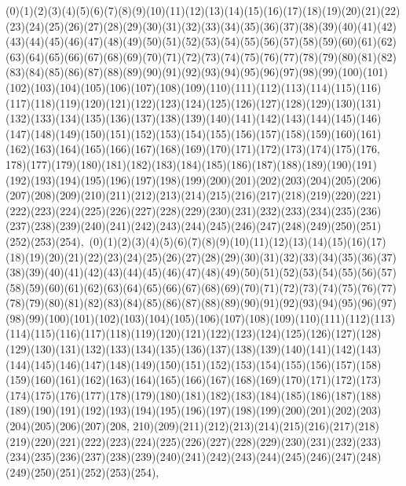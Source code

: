 \documentclass[12pt]{article}
\begin{document}
{(0)(1)(2)(3)(4)(5)(6)(7)(8)(9)(10)(11)(12)(13)(14)(15)(16)(17)(18)(19)(20)(21)(22)(23)(24)(25)(26)(27)(28)(29)(30)(31)(32)(33)(34)(35)(36)(37)(38)(39)(40)(41)(42)(43)(44)(45)(46)(47)(48)(49)(50)(51)(52)(53)(54)(55)(56)(57)(58)(59)(60)(61)(62)(63)(64)(65)(66)(67)(68)(69)(70)(71)(72)(73)(74)(75)(76)(77)(78)(79)(80)(81)(82)(83)(84)(85)(86)(87)(88)(89)(90)(91)(92)(93)(94)(95)(96)(97)(98)(99)(100)(101)(102)(103)(104)(105)(106)(107)(108)(109)(110)(111)(112)(113)(114)(115)(116)(117)(118)(119)(120)(121)(122)(123)(124)(125)(126)(127)(128)(129)(130)(131)(132)(133)(134)(135)(136)(137)(138)(139)(140)(141)(142)(143)(144)(145)(146)(147)(148)(149)(150)(151)(152)(153)(154)(155)(156)(157)(158)(159)(160)(161)(162)(163)(164)(165)(166)(167)(168)(169)(170)(171)(172)(173)(174)(175)(176, 178)(177)(179)(180)(181)(182)(183)(184)(185)(186)(187)(188)(189)(190)(191)(192)(193)(194)(195)(196)(197)(198)(199)(200)(201)(202)(203)(204)(205)(206)(207)(208)(209)(210)(211)(212)(213)(214)(215)(216)(217)(218)(219)(220)(221)(222)(223)(224)(225)(226)(227)(228)(229)(230)(231)(232)(233)(234)(235)(236)(237)(238)(239)(240)(241)(242)(243)(244)(245)(246)(247)(248)(249)(250)(251)(252)(253)(254)$
, 
$
(0)(1)(2)(3)(4)(5)(6)(7)(8)(9)(10)(11)(12)(13)(14)(15)(16)(17)(18)(19)(20)(21)(22)(23)(24)(25)(26)(27)(28)(29)(30)(31)(32)(33)(34)(35)(36)(37)(38)(39)(40)(41)(42)(43)(44)(45)(46)(47)(48)(49)(50)(51)(52)(53)(54)(55)(56)(57)(58)(59)(60)(61)(62)(63)(64)(65)(66)(67)(68)(69)(70)(71)(72)(73)(74)(75)(76)(77)(78)(79)(80)(81)(82)(83)(84)(85)(86)(87)(88)(89)(90)(91)(92)(93)(94)(95)(96)(97)(98)(99)(100)(101)(102)(103)(104)(105)(106)(107)(108)(109)(110)(111)(112)(113)(114)(115)(116)(117)(118)(119)(120)(121)(122)(123)(124)(125)(126)(127)(128)(129)(130)(131)(132)(133)(134)(135)(136)(137)(138)(139)(140)(141)(142)(143)(144)(145)(146)(147)(148)(149)(150)(151)(152)(153)(154)(155)(156)(157)(158)(159)(160)(161)(162)(163)(164)(165)(166)(167)(168)(169)(170)(171)(172)(173)(174)(175)(176)(177)(178)(179)(180)(181)(182)(183)(184)(185)(186)(187)(188)(189)(190)(191)(192)(193)(194)(195)(196)(197)(198)(199)(200)(201)(202)(203)(204)(205)(206)(207)(208, 210)(209)(211)(212)(213)(214)(215)(216)(217)(218)(219)(220)(221)(222)(223)(224)(225)(226)(227)(228)(229)(230)(231)(232)(233)(234)(235)(236)(237)(238)(239)(240)(241)(242)(243)(244)(245)(246)(247)(248)(249)(250)(251)(252)(253)(254)$
, 
$
}
\end{document}
